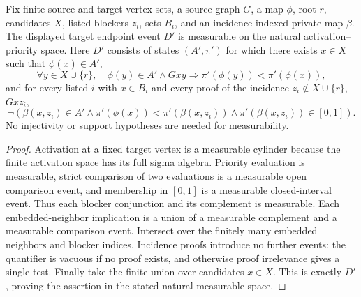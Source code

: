 \begin{helper}
Fix finite source and target vertex sets, a source graph \(G\), a map
\(\phi\), root \(r\), candidates \(X\), listed blockers \(z_i\), sets
\(B_i\), and an incidence-indexed private map \(\beta\).
The displayed target endpoint event \(D'\) is measurable on the natural
activation--priority space. Here \(D'\) consists of states \((A',\pi')\)
for which there exists \(x\in X\) such that \(\phi(x)\in A'\),
\[
 \forall y\in X\cup\{r\},\quad
 \phi(y)\in A'\land Gxy\Rightarrow\pi'(\phi(y))<\pi'(\phi(x)),
\]
and for every listed \(i\) with \(x\in B_i\) and every proof of the
incidence \(z_i\notin X\cup\{r\}\), \(Gxz_i\),
\[
 \neg(\beta(x,z_i)\in A'\land
 \pi'(\phi(x))<\pi'(\beta(x,z_i))\land\pi'(\beta(x,z_i))\in[0,1]).
\]
No injectivity or support hypotheses are needed for measurability.
\end{helper}
\begin{proof}
Activation at a fixed target vertex is a measurable cylinder because
the finite activation space has its full sigma algebra. Priority
evaluation is measurable, strict comparison of two evaluations is a
measurable open comparison event, and membership in \([0,1]\) is a
measurable closed-interval event. Thus each blocker conjunction and its
complement is measurable. Each embedded-neighbor implication is a union
of a measurable complement and a measurable comparison event.
Intersect over the finitely many embedded neighbors and blocker indices.
Incidence proofs introduce no further events: the quantifier is vacuous
if no proof exists, and otherwise proof irrelevance gives a single test.
Finally take the finite union over candidates \(x\in X\). This is exactly
\(D'\), proving the assertion in the stated natural measurable space.
\end{proof}

